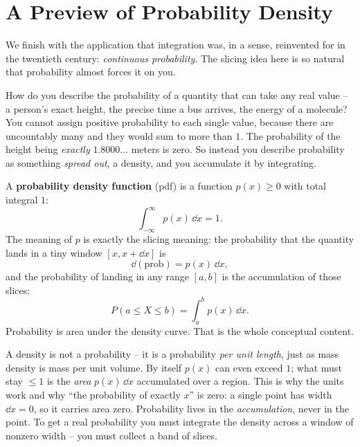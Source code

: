 \section{A Preview of Probability Density}
\label{ch26:probability}

We finish with the application that integration was, in a sense, reinvented for in
the twentieth century: \emph{continuous probability}. The slicing idea here is so
natural that probability almost forces it on you.

How do you describe the probability of a quantity that can take any real value --
a person's exact height, the precise time a bus arrives, the energy of a molecule?
You cannot assign positive probability to each single value, because there are
uncountably many and they would sum to more than $1$. The probability of the height
being \emph{exactly} $1.8000\ldots$ meters is zero. So instead you describe
probability as something \emph{spread out}, a density, and you accumulate it by
integrating.

A \textbf{probability density function} (pdf) is a function $p(x) \ge 0$ with total
integral $1$:
\[
  \int_{-\infty}^{\infty} p(x)\,\dd x = 1.
\]
The meaning of $p$ is exactly the slicing meaning: the probability that the quantity
lands in a tiny window $[x, x+\dd x]$ is
\[
  \dd(\text{prob}) = p(x)\,\dd x,
\]
and the probability of landing in any range $[a,b]$ is the accumulation of those
slices:
\[
  \boxed{\,P(a \le X \le b) = \int_a^b p(x)\,\dd x.\,}
\]
Probability is area under the density curve. That is the whole conceptual content.

\begin{happeningbox}
A density is not a probability -- it is a probability \emph{per unit length}, just
as mass density is mass per unit volume. By itself $p(x)$ can even exceed $1$; what
must stay $\le 1$ is the \emph{area} $p(x)\,\dd x$ accumulated over a region. This
is why the units work and why ``the probability of exactly $x$'' is zero: a single
point has width $\dd x = 0$, so it carries area zero. Probability lives in the
\emph{accumulation}, never in the point. To get a real probability you must
integrate the density across a window of nonzero width -- you must collect a band
of slices.
\end{happeningbox}

